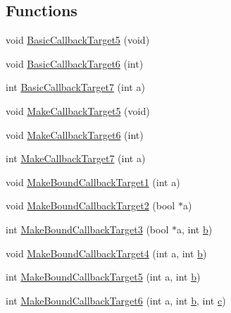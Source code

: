 \subsection*{Functions}
\begin{DoxyCompactItemize}
\item 
void \hyperlink{callback-test-suite_8cc_ad07263d7c54038463ca8e51768c47e34}{Basic\+Callback\+Target5} (void)
\item 
void \hyperlink{callback-test-suite_8cc_a602bf8811b41389f55ea481d16cdafbf}{Basic\+Callback\+Target6} (int)
\item 
int \hyperlink{callback-test-suite_8cc_a5593766be7f62db1560dfd17941db9b1}{Basic\+Callback\+Target7} (int a)
\item 
void \hyperlink{callback-test-suite_8cc_ad3e77ec8c845a4e9ae79add079a2c235}{Make\+Callback\+Target5} (void)
\item 
void \hyperlink{callback-test-suite_8cc_aef81fbc5e9509314c3118040beb00ff1}{Make\+Callback\+Target6} (int)
\item 
int \hyperlink{callback-test-suite_8cc_a2b9cdd249f47dced205dfe0eb8396f80}{Make\+Callback\+Target7} (int a)
\item 
void \hyperlink{callback-test-suite_8cc_af2a65c75c04ccf8189d0b888395a6f32}{Make\+Bound\+Callback\+Target1} (int a)
\item 
void \hyperlink{callback-test-suite_8cc_a5b37e6377261ecf9c70641469e538700}{Make\+Bound\+Callback\+Target2} (bool $\ast$a)
\item 
int \hyperlink{callback-test-suite_8cc_a8748da9abbffd91eee6535b35fd616c9}{Make\+Bound\+Callback\+Target3} (bool $\ast$a, int \hyperlink{lte__pathloss_8m_a21ad0bd836b90d08f4cf640b4c298e7c}{b})
\item 
void \hyperlink{callback-test-suite_8cc_a87609ce803be4cfed07341253cfbe729}{Make\+Bound\+Callback\+Target4} (int a, int \hyperlink{lte__pathloss_8m_a21ad0bd836b90d08f4cf640b4c298e7c}{b})
\item 
int \hyperlink{callback-test-suite_8cc_a1a26b4dbf16e2882ca73896878a6e743}{Make\+Bound\+Callback\+Target5} (int a, int \hyperlink{lte__pathloss_8m_a21ad0bd836b90d08f4cf640b4c298e7c}{b})
\item 
int \hyperlink{callback-test-suite_8cc_a763e49a4c1a91bb41e8c3754289aa029}{Make\+Bound\+Callback\+Target6} (int a, int \hyperlink{lte__pathloss_8m_a21ad0bd836b90d08f4cf640b4c298e7c}{b}, int \hyperlink{mmwave_2model_2fading-traces_2fading__trace__generator_8m_ae0323a9039add2978bf5b49550572c7c}{c})
\item 

\end{DoxyCompactItemize}
